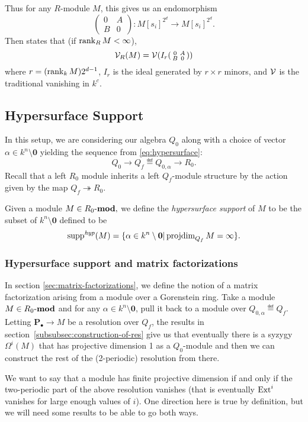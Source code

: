 \documentclass[12pt]{article}
\DeclareMathOperator{\supph}{supp^\mathit{hyp}}
\begin{document}
Thus for any $R$-module $M$, this gives us an endomorphism
\[\begin{pmatrix}
0& A\\B & 0
\end{pmatrix}:M[s_i]^{2^d}\to M[s_i]^{2^d}.\]
Then \cite[Thm. 4.4]{avramov-iyengar} states that (if $\operatorname{rank}_R M<\infty$),
\[\mathcal{V}_R(M)=\mathcal{V}(I_r(\begin{smallmatrix}0&A\\B&0\end{smallmatrix}))\]
where $r=(\operatorname{rank}_kM)2^{d-1}$, $I_r$ is the ideal generated by $r\times r$ minors, and $\mathcal{V}$ is the traditional vanishing in $k^c$.

\subsection{Hypersurface Support}

In this setup, we are considering our algebra $Q_0$ along with a choice of vector $\alpha\in k^n\setminus\mathbf{0}$ yielding the sequence from \eqref{eq:hypersurface}:
\[Q_0\to Q_f\eqdef Q_{0,\alpha}\to R_0.\]
Recall that a left $R_0$ module inherits a left $Q_f$-module structure by the action given by the map $Q_f\twoheadrightarrow R_0.$

\begin{defn}
    Given a module $M\in R_0\text{-}\mathbf{mod},$ we define the \emph{hypersurface support} of $M$ to be the subset of $k^n\setminus\mathbf 0$ defined to be
    \[\supph(M)=\{\alpha\in k^n\setminus\mathbf{0}|\projdim_{Q_f}M = \infty\}.\]
\end{defn}

\subsubsection{Hypersurface support and matrix factorizations}

In section \ref{sec:matrix-factorizations}, we define the notion of a matrix factorization arising from a module over a Gorenstein ring. Take a module $M\in R_0\text{-}\mathbf{mod}$ and for any $\alpha\in k^n\setminus\mathbf{0}$, pull it back to a module over $Q_{0,\alpha}\eqdef Q_f$. Letting $\mathbf{P}_\bullet\to M$ be a resolution over $Q_f$, the results in section~\ref{subsubsec:construction-of-res} give us that eventually there is a syzygy $\Omega^i(M)$ that has projective dimension 1 as a $Q_0$-module and then we can construct the rest of the (2-periodic) resolution from there.

We want to say that a module has finite projective dimension if and only if the two-periodic part of the above resolution vanishes (that is eventually $\operatorname{Ext}^i$ vanishes for large enough values of $i$). One direction here is true by definition, but we will need some results to be able to go both ways.
\end{document}
